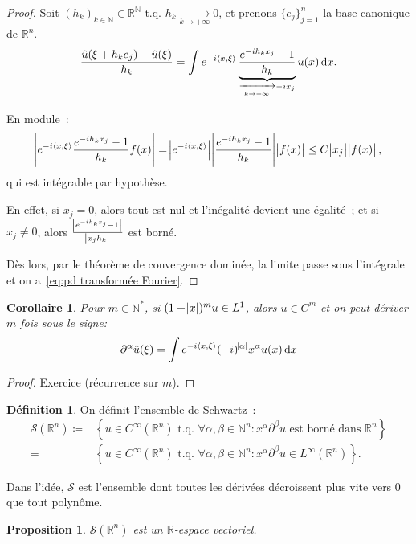 \documentclass{report}
\newcommand{\R}{{\mathbb R}}
\newcommand{\N}{{\mathbb N}}
\newcommand{\scpr}[2]{\left\langle#1, #2\right\rangle}
\newcommand{\tq}{\text{ t.q. }}
\newcommand{\pinfty}{{+\infty}}
\newtheorem{prp}[thm]{Proposition}
\newtheorem{cor}[thm]{Corollaire}
\theoremstyle{definition}
\newtheorem{déf}[thm]{Définition}
\theoremstyle{remark}
\begin{document}
\begin{proof} Soit $(h_k)_{k \in \N} \in \R^\N \tq h_k \xrightarrow[k \to \pinfty]{} 0$, et prenons $\{e_j\}_{j=1}^n$ la base canonique de $\R^n$.
\[\frac {\hat u(\xi + h_ke_j) - \hat u(\xi)}{h_k} = \int e^{-i\scpr x\xi}\underbrace {\frac {e^{-ih_kx_j}-1}{h_k}}_{\xrightarrow[k \to \pinfty]{} -ix_j}u(x)\dif x.\]

En module~:
\[\abs {e^{-i\scpr x\xi}\frac {e^{-ih_kx_j}-1}{h_k}f(x)} = \abs {e^{-i\scpr x\xi}}\abs {\frac {e^{-ih_kx_j}-1}{h_k}}\abs {f(x)} \leq C\abs {x_j}\abs {f(x)},\]
qui est intégrable par hypothèse.

En effet, si $x_j = 0$, alors tout est nul et l'inégalité devient une égalité~; et si $x_j \neq 0$, alors $\frac {\abs {e^{-ih_kx_j}-1}}{\abs {x_jh_k}}$ est borné.

Dès lors, par le théorème de convergence dominée, la limite passe sous l'intégrale et on a~\eqref{eq:pd transformée Fourier}.
\end{proof}

\begin{cor} Pour $m \in \N^*$, si $(1+\abs x)^mu \in L^1$, alors $u \in C^m$ et on peut dériver $m$ fois sous le signe:
\[\partial^\alpha\hat u(\xi) = \int e^{-i\scpr x\xi}(-i)^{\abs \alpha}x^\alpha u(x)\dif x\]
\end{cor}

\begin{proof} Exercice (récurrence sur $m$).
\end{proof}

\begin{déf} On définit l'ensemble de Schwartz~:
\begin{equation}\begin{aligned}
	\mathcal S(\R^n) \coloneqq &\left\{u \in C^\infty(\R^n) \tq \forall \alpha, \beta \in \N^n : x^\alpha\partial^\beta u \text{ est borné dans } \R^n\right\} \\
		= &\left\{u \in C^\infty(\R^n) \tq \forall \alpha, \beta \in \N^n : x^\alpha\partial^\beta u \in L^\infty(\R^n)\right\}.
\end{aligned}\end{equation}
\end{déf}

Dans l'idée, $\mathcal S$ est l'ensemble dont toutes les dérivées décroissent plus vite vers 0 que tout polynôme.

\begin{prp} $\mathcal S(\R^n)$ est un $\R$-espace vectoriel.
\end{prp}
\end{document}
